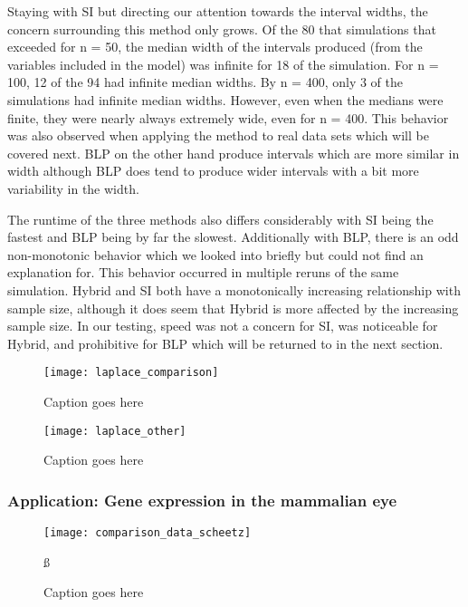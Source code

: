 Staying with SI but directing our attention towards the interval widths, the concern surrounding this method only grows. Of the 80 that simulations that exceeded for n = 50, the median width of the intervals produced (from the variables included in the model) was infinite for 18 of the simulation. For n = 100, 12 of the 94 had infinite median widths. By n = 400, only 3 of the simulations had infinite median widths. However, even when the medians were finite, they were nearly always extremely wide, even for n = 400. This behavior was also observed when applying the method to real data sets which will be covered next. BLP on the other hand produce intervals which are more similar in width although BLP does tend to produce wider intervals with a bit more variability in the width.

The runtime of the three methods also differs considerably with SI being the fastest and BLP being by far the slowest. Additionally with BLP, there is an odd non-monotonic behavior which we looked into briefly but could not find an explanation for. This behavior occurred in multiple reruns of the same simulation. Hybrid and SI both have a monotonically increasing relationship with sample size, although it does seem that Hybrid is more affected by the increasing sample size. In our testing, speed was not a concern for SI, was noticeable for Hybrid, and prohibitive for BLP which will be returned to in the next section.

  
  

\begin{figure}
  \texttt{[image: laplace\_comparison]}
  \caption{\label{Fig:laplace_comparison} Caption goes here}
\end{figure}


\begin{figure}
  \texttt{[image: laplace\_other]}
  \caption{\label{Fig:laplace_other} Caption goes here}
\end{figure}


\subsubsection{Application: Gene expression in the mammalian eye}


\begin{figure}
  \texttt{[image: comparison\_data\_scheetz]}
  \caption{\label{Fig:comparison_data_scheetz} Caption goes here}ß
\end{figure}

